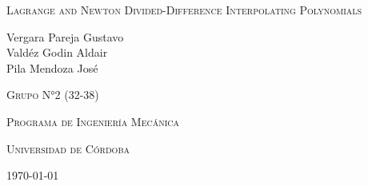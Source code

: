 \documentclass{article}
\begin{document}
\pgfplotsset{compat=1.18}
\begin{titlepage}
    \centering
    \vspace{3cm}
    {\scshape\Large Lagrange and Newton Divided-Difference Interpolating Polynomials\par}
    \vspace{3cm}
    \textbf\large\scshape{\par}
    \vspace{3cm}
    {\Large Vergara Pareja Gustavo\\Valdéz Godin Aldair\\Pila Mendoza José\par}
    \vspace{4cm}
    {\scshape\Large Grupo N°2 (32-38) \par}
    {\scshape\Large Programa de Ingeniería Mecánica \par}
    {\scshape\Large Universidad de Córdoba\par}
    {\Large \today \par}
\end{titlepage}
\end{document}
